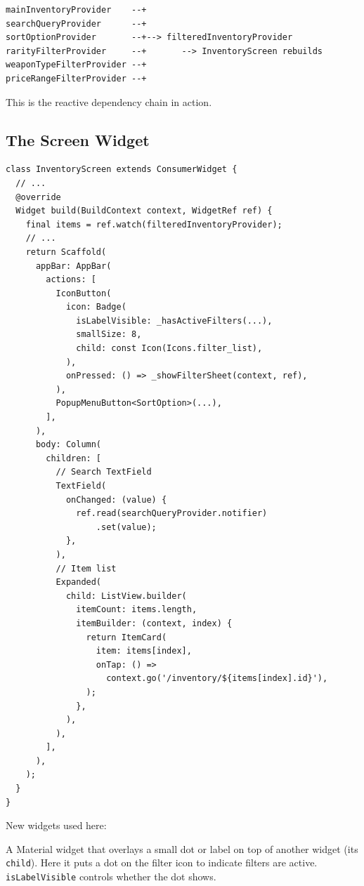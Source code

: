 \documentclass[11pt, a4paper]{article}
\begin{document}
\begin{lstlisting}[numbers=none]
mainInventoryProvider    --+
searchQueryProvider      --+
sortOptionProvider       --+--> filteredInventoryProvider
rarityFilterProvider     --+       --> InventoryScreen rebuilds
weaponTypeFilterProvider --+
priceRangeFilterProvider --+
\end{lstlisting}

This is the reactive dependency chain in action.

\subsection{The Screen Widget}

\begin{lstlisting}
class InventoryScreen extends ConsumerWidget {
  // ...
  @override
  Widget build(BuildContext context, WidgetRef ref) {
    final items = ref.watch(filteredInventoryProvider);
    // ...
    return Scaffold(
      appBar: AppBar(
        actions: [
          IconButton(
            icon: Badge(
              isLabelVisible: _hasActiveFilters(...),
              smallSize: 8,
              child: const Icon(Icons.filter_list),
            ),
            onPressed: () => _showFilterSheet(context, ref),
          ),
          PopupMenuButton<SortOption>(...),
        ],
      ),
      body: Column(
        children: [
          // Search TextField
          TextField(
            onChanged: (value) {
              ref.read(searchQueryProvider.notifier)
                  .set(value);
            },
          ),
          // Item list
          Expanded(
            child: ListView.builder(
              itemCount: items.length,
              itemBuilder: (context, index) {
                return ItemCard(
                  item: items[index],
                  onTap: () =>
                    context.go('/inventory/${items[index].id}'),
                );
              },
            ),
          ),
        ],
      ),
    );
  }
}
\end{lstlisting}

New widgets used here:

\begin{conceptbox}[title=\textbf{Badge}]
A Material widget that overlays a small dot or label on top of another widget (its \texttt{child}). Here it puts a dot on the filter icon to indicate filters are active. \texttt{isLabelVisible} controls whether the dot shows.
\end{conceptbox}
\end{document}
